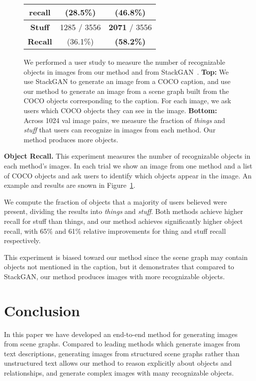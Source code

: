 \documentclass[10pt,twocolumn,letterpaper]{article}
\begin{document}
\begin{figure}
\begin{tabular}{c|cc}
    \textbf{recall}  & (28.5\%)   & \textbf{(46.8\%)} \\
    \hline
    \textbf{Stuff}   & 1285 / 3556 & \textbf{2071} / 3556 \\
    \textbf{Recall}  & (36.1\%)    & \textbf{(58.2\%)}
  \end{tabular}
  \vspace{1mm}
  \caption{
    We performed a user study to measure the number of recognizable objects in images from our
    method and from StackGAN~\cite{zhang2017stackgan}. \textbf{Top:} We use StackGAN to generate
    an image from a COCO caption, and use our method to generate an image from a scene graph built from
    the COCO objects corresponding to the caption. For each image, we ask users which COCO objects they
    can see in the image. \textbf{Bottom:} Across 1024 val image pairs, we measure the fraction of \emph{things}
    and \emph{stuff} that users can recognize in images from each method. Our method produces more objects.
  }
    \label{fig:object-study}
    \vspace{-3mm}
\end{figure}

 
\textbf{Object Recall.}
This experiment measures the number of recognizable objects in each method's images. In each trial we show an image from one method and a list of COCO objects and ask users to identify which objects appear in the image. An example and results are snown in Figure~\ref{fig:object-study}.

We compute the fraction of objects that a majority of users believed were
present, dividing the results into \emph{things} and \emph{stuff}. Both methods
achieve higher recall for stuff than things, and our method achieves
significantly higher object recall, with 65\% and 61\% relative improvements for thing and stuff recall respectively.

This experiment is biased toward our method since the scene graph may
contain objects not mentioned in the caption, but it demonstrates
that compared to StackGAN, our method produces images with
more recognizable objects.

 

\section{Conclusion}
In this paper we have developed an end-to-end method for generating images from
scene graphs. Compared to leading methods which generate images from text
descriptions, generating images from structured scene graphs rather than
unstructured text allows our method to reason explicitly about objects and
relationships, and generate complex images with many recognizable objects.
 
\end{document}
